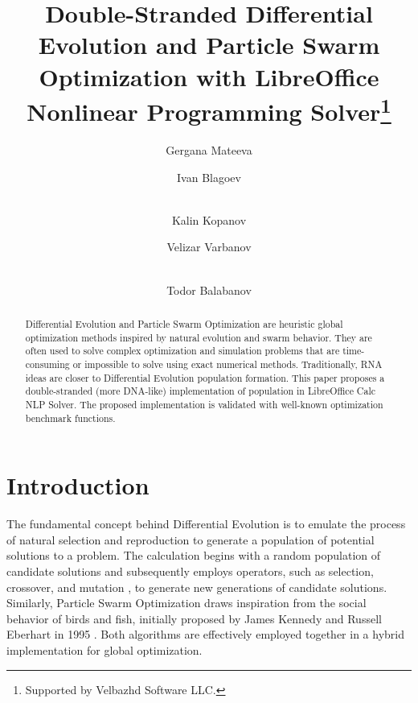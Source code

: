 \documentclass[runningheads]{llncs}
\begin{document}
\title{Double-Stranded Differential Evolution and Particle Swarm Optimization with LibreOffice Nonlinear Programming Solver\thanks{Supported by Velbazhd Software LLC.}}


\author{
Gergana Mateeva \and
Ivan Blagoev \and\\
Kalin Kopanov \and
Velizar Varbanov \and\\
Todor Balabanov
}



\maketitle

\begin{abstract}
Differential Evolution and Particle Swarm Optimization are heuristic global optimization methods inspired by natural evolution and swarm behavior. They are often used to solve complex optimization and simulation problems that are time-consuming or impossible to solve using exact numerical methods. Traditionally, RNA ideas are closer to Differential Evolution population formation. This paper proposes a double-stranded (more DNA-like) implementation of population in LibreOffice Calc NLP Solver. The proposed implementation is validated with well-known optimization benchmark functions.

\end{abstract}

\section{Introduction}

The fundamental concept behind Differential Evolution is to emulate the process of natural selection and reproduction to generate a population of potential solutions to a problem. The calculation begins with a random population of candidate solutions and subsequently employs operators, such as selection, crossover, and mutation \cite{Lambora-2019}, to generate new generations of candidate solutions. Similarly, Particle Swarm Optimization draws inspiration from the social behavior of birds and fish, initially proposed by James Kennedy and Russell Eberhart in 1995 \cite{Kennedy-1995}. Both algorithms are effectively employed together in a hybrid implementation for global optimization.
\end{document}
